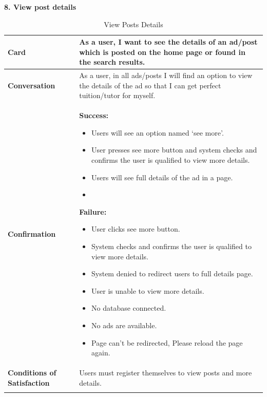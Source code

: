 \textbf{8. View  post details}
\begin{center}
\setlength{\tabcolsep}{0.8cm}
\renewcommand{\arraystretch}{1.2}
        \centering
        \begin{longtable}{|m{70pt}|p{9cm}|}
            \hline
                \textbf{Card} &
                As a user, I want to see the details of an ad/post which is posted on the home page or found in the search results.\\
            \hline
                \textbf{Conversation} &
                    As a user, in all ads/posts I will find an option to view the details of the ad so that I can get perfect tuition/tutor for myself. \\
            \hline
                \textbf{Confirmation} &
                     \textbf{ Success:}
                        \begin{itemize}
                            \item  Users will see an option named ‘see more’.
                            \item User presses see more button and system checks and confirms the user is qualified to view more details.
                            \item Users will see full details of the ad in a page. 
                            \item  
                        \end{itemize}
                    \textbf{Failure:}
                        \begin{itemize}
                            \item User clicks see more button.
                            \item System checks and confirms the user is qualified to view more details.
                            \item System denied to redirect users to full details page.
                            \item User is unable to view more details.
                            \item No database connected.
                            \item No ads are available.
                            \item Page can't be redirected, Please reload the page again.
                        \end{itemize} \\
            \hline
                \textbf{Conditions of Satisfaction} &  
                    Users must register themselves to view posts and more details.\\
            \hline
        \caption{View Posts Details}
        \label{tab:my_label}
        \end{longtable}
\end{center}

